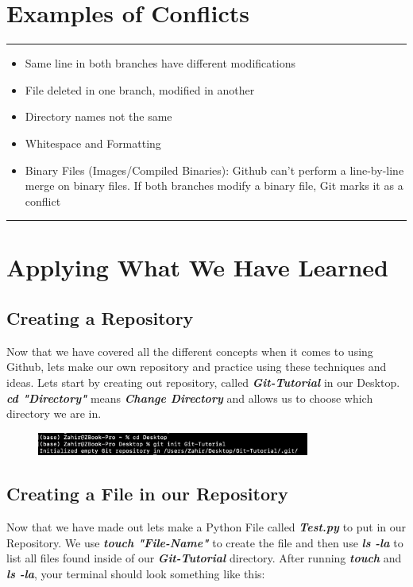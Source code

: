 \documentclass{article}
\begin{document}
\section*{Examples of Conflicts}
\hrule
\vspace{15pt}
\begin{itemize}
    \item Same line in both branches have different modifications
    \item File deleted in one branch, modified in another
    \item Directory names not the same
    \item Whitespace and Formatting
    \item Binary Files (Images/Compiled Binaries): Github can't perform a line-by-line merge on binary files. If both branches modify a binary file, Git marks it as a conflict 
\end{itemize}

\vspace{10pt}
\hrule
\vspace{10pt}

\section*{Applying What We Have Learned}
\subsection*{Creating a Repository}
Now that we have covered all the different concepts when it comes to using Github, lets make our own repository and practice using these techniques and ideas. Lets start by creating out repository, called \textit{\textbf{Git-Tutorial}} in our Desktop. \textit{\textbf{cd "Directory"}} means \textit{\textbf{Change Directory}} and allows us to choose which directory we are in.   

\begin{figure}[h]
    \centering
    \includegraphics[width=0.8\textwidth]{GI.png}
\end{figure}

\subsection*{Creating a File in our Repository}

Now that we have made out lets make a Python File called \textit{\textbf{Test.py}} to put in our Repository. We use \textit{\textbf{touch "File-Name"}} to create the file and then use \textit{\textbf{ls -la}} to list all files found inside of our \textit{\textbf{Git-Tutorial}} directory. After running \textit{\textbf{touch}} and \textit{\textbf{ls -la}}, your terminal should look something like this:
\end{document}
